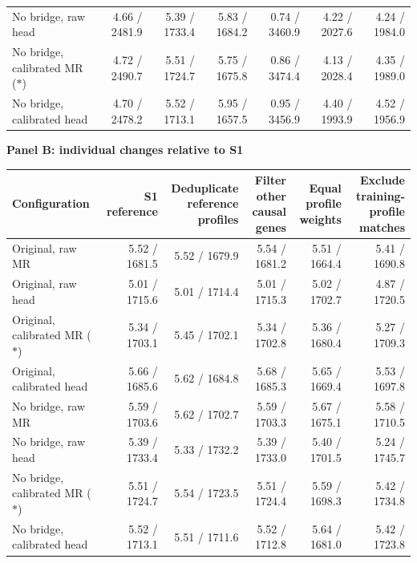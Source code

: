 \begin{landscape}
\begin{table}[p]
\begin{adjustbox}{max width=\linewidth}
\begin{tabular}{lrrrrrr}
No bridge, raw head & 4.66 / 2481.9 & 5.39 / 1733.4 & 5.83 / 1684.2 & 0.74 / 3460.9 & 4.22 / 2027.6 & 4.24 / 1984.0 \\
No bridge, calibrated MR ($\ast$) & 4.72 / 2490.7 & 5.51 / 1724.7 & 5.75 / 1675.8 & 0.86 / 3474.4 & 4.13 / 2028.4 & 4.35 / 1989.0 \\
No bridge, calibrated head & 4.70 / 2478.2 & 5.52 / 1713.1 & 5.95 / 1657.5 & 0.95 / 3456.9 & 4.40 / 1993.9 & 4.52 / 1956.9 \\
\bottomrule
\end{tabular}
\end{adjustbox}
\par\medskip
\textbf{Panel B: individual changes relative to S1}\par\smallskip
\begin{adjustbox}{max width=\linewidth}
\begin{tabular}{lrrrrr}
\toprule
Configuration & S1 reference & \shortstack{Deduplicate\\reference profiles} & \shortstack{Filter other\\causal genes} & \shortstack{Equal profile\\weights} & \shortstack{Exclude training-\\profile matches} \\
\midrule
Original, raw MR & 5.52 / 1681.5 & 5.52 / 1679.9 & 5.54 / 1681.2 & 5.51 / 1664.4 & 5.41 / 1690.8 \\
Original, raw head & 5.01 / 1715.6 & 5.01 / 1714.4 & 5.01 / 1715.3 & 5.02 / 1702.7 & 4.87 / 1720.5 \\
Original, calibrated MR ($\ast$) & 5.34 / 1703.1 & 5.45 / 1702.1 & 5.34 / 1702.8 & 5.36 / 1680.4 & 5.27 / 1709.3 \\
Original, calibrated head & 5.66 / 1685.6 & 5.62 / 1684.8 & 5.68 / 1685.3 & 5.65 / 1669.4 & 5.53 / 1697.8 \\
No bridge, raw MR & 5.59 / 1703.6 & 5.62 / 1702.7 & 5.59 / 1703.3 & 5.67 / 1675.1 & 5.58 / 1710.5 \\
No bridge, raw head & 5.39 / 1733.4 & 5.33 / 1732.2 & 5.39 / 1733.0 & 5.40 / 1701.5 & 5.24 / 1745.7 \\
No bridge, calibrated MR ($\ast$) & 5.51 / 1724.7 & 5.54 / 1723.5 & 5.51 / 1724.4 & 5.59 / 1698.3 & 5.42 / 1734.8 \\
No bridge, calibrated head & 5.52 / 1713.1 & 5.51 / 1711.6 & 5.52 / 1712.8 & 5.64 / 1681.0 & 5.42 / 1723.8 \\
\bottomrule
\end{tabular}
\end{adjustbox}
\end{table}
\clearpage
\end{landscape}
